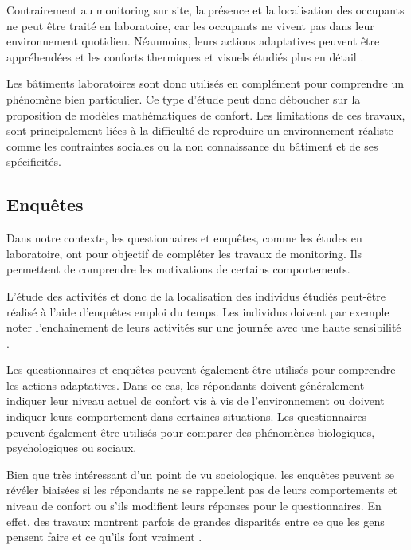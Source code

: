 Contrairement au monitoring sur site, la présence et la localisation des occupants ne peut être traité en laboratoire, car les occupants ne vivent pas dans leur environnement quotidien. Néanmoins, leurs actions adaptatives peuvent être appréhendées et les conforts thermiques et visuels étudiés plus en détail \cite{Schweiker-16}.

Les bâtiments laboratoires sont donc utilisés en complément pour comprendre un phénomène bien particulier. Ce type d'étude peut donc déboucher sur la proposition de modèles mathématiques de confort. Les limitations de ces travaux, sont principalement liées à la difficulté de reproduire un environnement réaliste comme les contraintes sociales ou la non connaissance du bâtiment et de ses spécificités.

\subsection{Enquêtes}
\label{Enquêtes}

Dans notre contexte, les questionnaires et enquêtes, comme les études en laboratoire, ont pour objectif de compléter les travaux de monitoring. Ils permettent de comprendre les motivations de certains comportements.

L'étude des activités et donc de la localisation des individus étudiés peut-être réalisé à l'aide d'enquêtes emploi du temps. Les individus doivent par exemple noter l'enchainement de leurs activités sur une journée avec une haute sensibilité \cite{Ricroch-12}.

Les questionnaires et enquêtes peuvent également être utilisés pour comprendre les actions adaptatives. Dans ce cas, les répondants doivent généralement indiquer leur niveau actuel de confort vis à vis de l'environnement ou doivent indiquer leurs comportement dans certaines situations. Les questionnaires peuvent également être utilisés pour comparer des phénomènes biologiques, psychologiques ou sociaux.

Bien que très intéressant d'un point de vu sociologique, les enquêtes peuvent se révéler biaisées si les répondants ne se rappellent pas de leurs comportements et niveau de confort ou s'ils modifient leurs réponses pour le questionnaires. En effet, des travaux montrent parfois de grandes disparités entre ce que les gens pensent faire et ce qu'ils font vraiment \cite{Gauthier-15}. 

